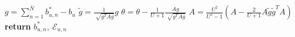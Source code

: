 \begin{algorithm}[t]
\begin{equation*}
            \end{equation*}
    \EndFor 
    \vspace{0.1cm}
    \State $g = \sum_{n = 1}^{\bar{N}}  b_{u,n}^* - b_u$
    \vspace{0.1cm}
	\State $\tilde{g} = \frac{1}{\sqrt[]{g^TAg}}g$
    \vspace{0.1cm}
    \State $\theta = \theta - \frac{1}{U+1}\frac{Ag}{\sqrt[]{g^TAg}}$
    \vspace{0.1cm}
    \State $A = \frac{U^2}{U^2-1}(A - \frac{2}{U+1} A \tilde{g}\tilde{g}^T A)$
\ENDWHILE
\vspace{0.1cm}
\State \textbf{return} $b_{u,n}^*, \: \mathcal{E}_{u,n}$
\end{algorithm}
